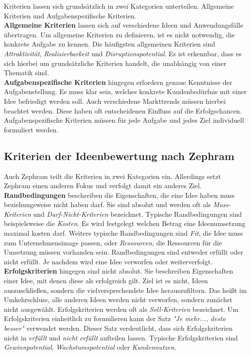 Kriterien lassen sich grundsätzlich in zwei Kategorien unterteilen. Allgemeine Kriterien und Aufgabenspezifische Kriterien.\\
\textbf{Allgemeine Kriterien} lassen sich auf verschiedene Ideen und Anwendungsfälle übertragen.
Um allgemeine Kriterien zu definieren, ist es nicht notwendig, die konkrete Aufgabe zu kennen. 
Die häufigsten allgemeinen Kriterien sind \textit{Attraktivität}, \textit{Realisierbarkeit} und 
\textit{Disruptionspotential}. Es ist erkennbar, dass es sich hierbei um grundsätzliche Kriterien handelt, die unabhängig von einer Thematik sind.\\
\textbf{Aufgabenspezifische Kriterien} hingegen erfordern genaue Kenntnisse der Aufgabenstellung. Es muss klar sein, welches 
konkrete Kundenbedürfnis mit einer Idee befriedigt werden soll. Auch verschiedene Markttrends müssen hierbei beachtet werden. 
Diese haben oft entscheidenen Einfluss auf die Erfolgschancen. Aufgabenspezifische Kriterien müssen für jede Aufgabe und jedes Ziel 
individuell formuliert werden.
\cite{grossklaus:2008}

\subsection{Kriterien der Ideenbewertung nach Zephram}
Auch Zephram teilt die Kriterien in zwei Kategorien ein. Allerdings setzt Zephram einen anderen Fokus und verfolgt 
damit ein anderes Ziel.\\

\textbf{Randbedingungen} beschreiben die Eigenschaften, die eine Idee haben muss
beziehungsweise nicht haben darf. Sie sind absolut und werden oft als \textit{Muss-Kriterien}
und \textit{Darf-Nicht-Kriterien} bezeichnet.
Typische Randbedingungen sind beispielsweise die \textit{Kosten}. 
Es wird festgelegt welchen Betrag eine Ideenumsetzung maximal kosten darf. 
Weitere typische Randbedingungen sind \textit{Fit}, die Idee muss zum Unternehmensimage passen, oder \textit{Ressourcen}, die Ressourcen für die
Umsetzung müssen vorhanden sein. 
Randbedingungen sind entweder erfüllt oder nicht erfüllt. Je nachdem wird eine Idee verworfen oder weiterverfolgt. \\

\textbf{Erfolgskriterien} hingegen sind nicht absolut. Sie beschreiben Eigenschaften einer Idee, 
mit denen diese als erfolgreich gilt. Ziel ist es nicht, Ideen auszuschließen, sondern die
vielversprechendste Idee herauszufiltern. Das heißt im Umkehrschluss, alle anderen Ideen werden nicht 
verworfen, sondern zunächst nicht ausgewählt. Erfolgskriterien werden oft als \textit{Soll-Kriterien} bezeichnet. Um 
Erfolgskriterien einheitlich zu formulieren kann der Satz \textit{"Je mehr..., desto besser"} verwendet werden.
Dieser Satz verdeutlicht, dass sich Erfolgskriterien nicht in \textit{erfüllt} und \textit{nicht erfüllt} aufteilen 
lassen. Typische Erfolgskriterien sind \textit{Gewinnpotential}, \textit{Wachstumspotential} oder \textit{Kundennutzen}.\\

